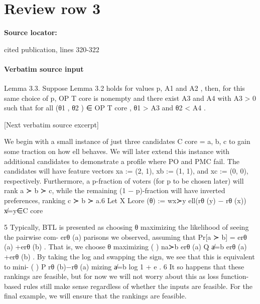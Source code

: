 \documentclass[10pt]{article}
\begin{document}
\section*{Review row 3}
\textbf{Source locator:} {\footnotesize\raggedright cited publication, lines 320-\allowbreak{}322\par}
\paragraph{Verbatim source input}
\begin{ReviewVerbatim}
Lemma 3.3. Suppose Lemma 3.2 holds for values p, A1 and A2 , then, for this same choice of p,
OP T core is nonempty and there exist A3 and A4 with A3 > 0 such that for all (θ1 , θ2 ) ∈ OP T core ,
θ1 > A3 and θ2 < A4 .

[Next verbatim source excerpt]

We begin with a small instance of just three candidates C core = {a, b, c} to gain some traction on
how ell behaves. We will later extend this instance with additional candidates to demonstrate a profile
where PO and PMC fail. The candidates will have feature vectors xa := (2, 1), xb := (1, 1), and
xc := (0, 0), respectively. Furthermore, a p-fraction of voters (for p to be chosen later) will rank
a ≻ b ≻ c, while the remaining (1 − p)-fraction will have inverted preferences, ranking c ≻ b ≻ a.6
Let                                              X
                              Lcore (θ) :=                  wx≻y ell(rθ (y) − rθ (x))
                                              x̸=y∈C core

      5
     Typically, BTL is presented as choosing θ maximizing the likelihood of seeing the pairwise com-
                                                                erθ (a)
parisons we observed, assuming that Pr[a ≻ b] = erθ (a)           +erθ (b)
                                                                           . That is, we choose θ maximizing
       (                ) na≻b
            erθ (a)
Q
  a̸=b erθ (a) +erθ (b)         . By taking the log and swapping the sign, we see that this is equivalent to mini-
                    (                     )
        P                   rθ (b)−rθ (a)
mizing a̸=b log 1 + e                      .
    6
      It so happens that these rankings are feasible, but for now we will not worry about this as loss function-
based rules still make sense regardless of whether the inputs are feasible. For the final example, we will ensure
that the rankings are feasible.



\end{ReviewVerbatim}
\end{document}
